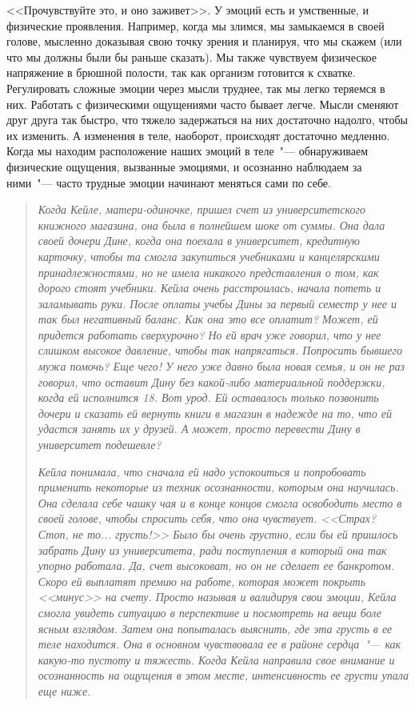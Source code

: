 \vspace{1ex}

<<Прочувствуйте это, и оно заживет>>. У эмоций есть и умственные, и физические проявления. Например, когда мы злимся, мы замыкаемся в своей голове, мысленно доказывая свою точку зрения и планируя, что мы скажем (или что мы должны были бы раньше сказать). Мы также чувствуем физическое напряжение в брюшной полости, так как организм готовится к схватке. Регулировать сложные эмоции через мысли труднее, так мы легко теряемся в них. Работать с физическими ощущениями часто бывает легче. Мысли сменяют друг друга так быстро, что тяжело задержаться на них достаточно надолго, чтобы их изменить. А изменения в теле, наоборот, происходят достаточно медленно. Когда мы находим расположение наших эмоций в теле~"--- обнаруживаем физические ощущения, вызванные эмоциями, и осознанно наблюдаем за ними~"--- часто трудные эмоции начинают меняться сами по себе.

\begin{quotation}
	\textit{
		Когда Кейле, матери-одиночке, пришел счет из университетского книжного магазина, она была в полнейшем шоке от суммы. Она дала своей дочери Дине, когда она поехала в университет, кредитную карточку, чтобы та смогла закупиться учебниками и канцелярскими принадлежностями, но не имела никакого представления о том, как дорого стоят учебники. Кейла очень расстроилась, начала потеть и заламывать руки. После оплаты учебы Дины за первый семестр у нее и так был негативный баланс. Как она это все оплатит? Может, ей придется работать сверхурочно? Но ей врач уже говорил, что у нее слишком высокое давление, чтобы так напрягаться. Попросить бывшего мужа помочь? Еще чего! У него уже давно была новая семья, и он не раз говорил, что оставит Дину без какой-либо материальной поддержки, когда ей исполнится 18. Вот урод. Ей оставалось только позвонить дочери и сказать ей вернуть книги в магазин в надежде на то, что ей удастся занять их у друзей. А может, просто перевести Дину в университет подешевле?
	}

	\textit{
		Кейла понимала, что сначала ей надо успокоиться и попробовать применить некоторые из техник осознанности, которым она научилась. Она сделала себе чашку чая и в конце концов смогла освободить место в своей голове, чтобы спросить себя, что она чувствует. <<Страх? Стоп, не то... грусть!>> Было бы очень грустно, если бы ей пришлось забрать Дину из университета, ради поступления в который она так упорно работала. Да, счет высоковат, но он не сделает ее банкротом. Скоро ей выплатят премию на работе, которая может покрыть <<минус>> на счету. Просто называя и валидируя свои эмоции, Кейла смогла увидеть ситуацию в перспективе и посмотреть на вещи боле ясным взглядом. Затем она попыталась выяснить, где эта грусть в ее теле находится. Она в основном чувствовала ее в районе сердца~"--- как какую-то пустоту и тяжесть. Когда Кейла направила свое внимание и осознанность на ощущения в этом месте, интенсивность ее грусти упала еще ниже.
	}
\end{quotation}

